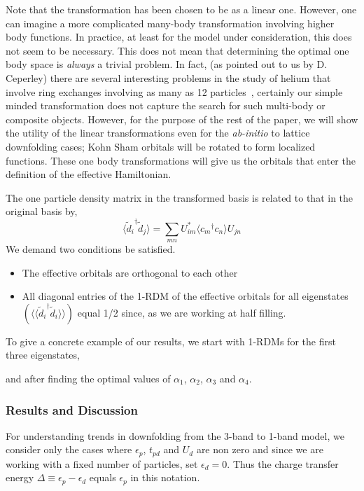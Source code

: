 \documentclass[prl,12pt,onecolumn,nofootinbib,notitlepage,english,superscriptaddress]{revtex4-1}
\begin{document}
Note that the transformation has been chosen to be as a linear one. However, 
one can imagine a more complicated many-body transformation involving higher body functions. 
In practice, at least for the model under consideration, this does not seem to be necessary. 
This does not mean that determining the optimal one body space is \emph{always} a trivial problem. 
In fact, (as pointed out to us by D. Ceperley) there are several interesting problems in the study of helium 
that involve ring exchanges involving as many as 12 particles~\cite{Ceperley_Jacucci}, 
certainly our simple minded transformation does not capture the search for such multi-body 
or composite objects. However, for the purpose of the rest of the paper, we will show the utility 
of the linear transformations even for the \emph{ab-initio} to lattice downfolding cases; 
Kohn Sham orbitals will be rotated to form localized functions. These one body transformations will give us the orbitals 
that enter the definition of the effective Hamiltonian. 

The one particle density matrix in the transformed basis is related 
to that in the original basis by,
\begin{equation}
	\langle {\tilde{d}_i}^{\dagger} \tilde{d}_{j} \rangle = \sum_{mn} U^{*}_{im} \langle {c_m}^{\dagger} c_n \rangle U_{jn}
\end{equation}
We demand two conditions be satisfied.
\begin{itemize} 
 \item The effective orbitals are orthogonal to each other 
 \item All diagonal entries of the 1-RDM of the effective orbitals for all eigenstates 
       $(\langle \langle {\tilde{d}_i}^{\dagger} \tilde{d}_{i} \rangle \rangle)$ 
       equal 1/2 since, as we are working at half filling.
\end{itemize} 

To give a concrete example of our results, we start with 1-RDMs for the first three eigenstates, 

and after finding the optimal values of $\alpha_1$, $\alpha_2$, $\alpha_3$ and $\alpha_4$.

\subsubsection{Results and Discussion}
For understanding trends in downfolding from the 3-band to 1-band model, we consider only 
the cases where $\epsilon_p$, $t_{pd}$ and $U_{d}$ are non zero and 
since we are working with a fixed number of particles, set $\epsilon_d = 0$. Thus the 
charge transfer energy $\Delta \equiv \epsilon_p - \epsilon_d$ equals $\epsilon_p$ in this notation. 
 
\end{document}
